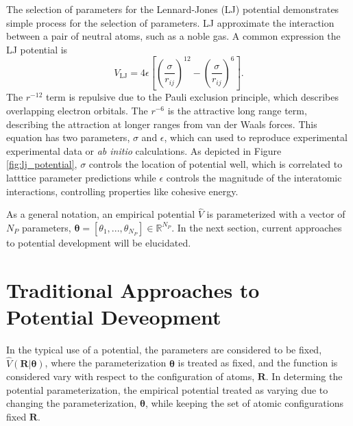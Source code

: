The selection of parameters for the Lennard-Jones (LJ)\cite{lennardjones1924_lj_pot} potential demonstrates simple process for the selection of parameters. LJ approximate the interaction between a pair of neutral atoms, such as a noble gas.  A common expression the LJ potential is
\begin{equation}
  V_{\text{LJ}} = 4 \epsilon
    \left[
	\left(\frac{\sigma}{r_{ij}}\right)^{12}
	- \left(\frac{\sigma}{r_{ij}}\right)^{6}
    \right].
\end{equation}
The $r^{-12}$ term is repulsive due to the Pauli exclusion principle, which describes overlapping electron orbitals.  The $r^{-6}$ is the attractive long range term, describing the attraction at longer ranges from van der Waals forces.  This equation has two parameters, $\sigma$ and $\epsilon$, which can used to reproduce experimental experimental data or \emph{ab initio} calculations.  As depicted in Figure \ref{fig:lj_potential}, $\sigma$ controls the location of potential well, which is correlated to latttice parameter predictions while $\epsilon$ controls the magnitude of the interatomic interactions, controlling properties like cohesive energy.

As a general notation, an empirical potential $\hat{V}$ is parameterized with a vector of $N_P$ parameters, $\bm{\theta} = [\theta_1,...,\theta_{N_P}] \in \mathbb{R}^{N_P}$.  In the next section, current approaches to potential development will be elucidated.

\section{Traditional Approaches to Potential Deveopment}

In the typical use of a potential, the parameters are considered to be fixed, $\hat{V}(\bm{R}|\bm{\theta})$, where the parameterization $\bm{\theta}$ is treated as fixed, and the function is considered vary with respect to the configuration of atoms, $\bm{R}$.  In determing the potential parameterization, the empirical potential treated as varying due to changing the parameterization, $\bm{\theta}$, while keeping the set of atomic configurations fixed $\bm{R}$.

